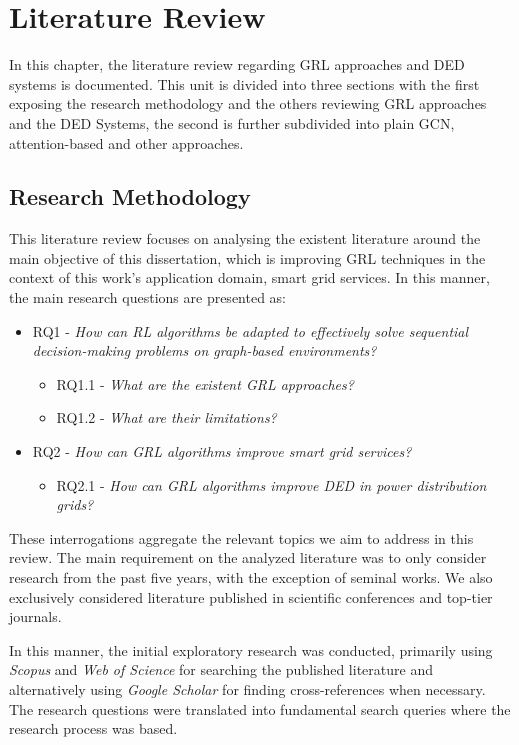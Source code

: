 \chapter{Literature Review} \label{chap:review}

In this chapter, the literature review regarding \ac{GRL} approaches and \ac{DED} systems is documented. This unit is divided into three sections with the first exposing the research methodology and the others reviewing \ac{GRL} approaches and the \ac{DED} Systems, the second is further subdivided into plain \ac{GCN}, attention-based and other approaches.

\section{Research Methodology} \label{sec:review-method}

This literature review focuses on analysing the existent literature around the main objective of this dissertation, which is improving \ac{GRL} techniques in the context of this work's application domain, smart grid services. In this manner, the main research questions are presented as:

\begin{itemize}
	\item RQ1 - \textit{How can \ac{RL} algorithms be adapted to effectively solve sequential decision-making problems on graph-based environments?} 
	\begin{itemize}
		\item RQ1.1 - \textit{What are the existent \ac{GRL} approaches?}
		\item RQ1.2 - \textit{What are their limitations? }
	\end{itemize}
	\item RQ2 - \textit{How can \ac{GRL} algorithms improve smart grid services?}
	\begin{itemize}
		\item RQ2.1 - \textit{How can \ac{GRL} algorithms improve \acf{DED} in power distribution grids?}
	\end{itemize}
\end{itemize}

These interrogations aggregate the relevant topics we aim to address in this review. The main requirement on the analyzed literature was to only consider research from the past five years, with the exception of seminal works. We also exclusively considered literature published in scientific conferences and top-tier journals. \par
In this manner, the initial exploratory research was conducted, primarily using \textit{Scopus} and \textit{Web of Science} for searching the published literature and alternatively using \textit{Google Scholar} for finding cross-references when necessary. 
The research questions were translated into fundamental search queries where the research process was based.


